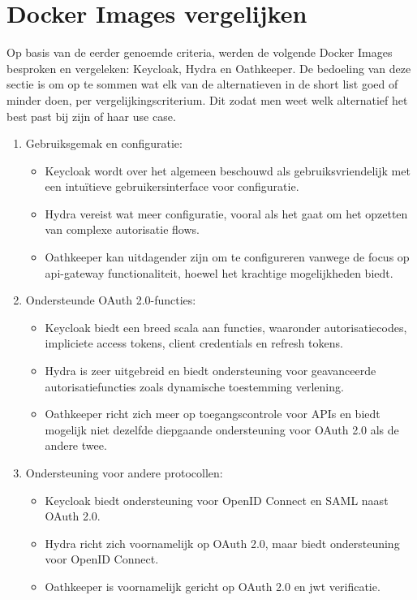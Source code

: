 \section{Docker Images vergelijken}%
\label{sec:docker-images-vergelijken}
Op basis van de eerder genoemde criteria, werden de volgende Docker Images besproken en vergeleken: Keycloak, Hydra en Oathkeeper.
De bedoeling van deze sectie is om op te sommen wat elk van de alternatieven in de short list goed of minder doen, per vergelijkingscriterium.
Dit zodat men weet welk alternatief het best past bij zijn of haar use case.

\begin{enumerate}
  \item Gebruiksgemak en configuratie:
  \begin{itemize}
    \item Keycloak wordt over het algemeen beschouwd als gebruiksvriendelijk met een intuïtieve gebruikersinterface voor configuratie.
    \item Hydra vereist wat meer configuratie, vooral als het gaat om het opzetten van complexe autorisatie flows.
    \item Oathkeeper kan uitdagender zijn om te configureren vanwege de focus op \gls{api}-gateway functionaliteit, hoewel het krachtige mogelijkheden biedt.
  \end{itemize}
  
  \item Ondersteunde OAuth 2.0-functies:
  \begin{itemize}
    \item Keycloak biedt een breed scala aan functies, waaronder autorisatiecodes, impliciete access tokens, client credentials en refresh tokens.
    \item Hydra is zeer uitgebreid en biedt ondersteuning voor geavanceerde autorisatiefuncties zoals dynamische toestemming verlening.
    \item Oathkeeper richt zich meer op toegangscontrole voor APIs en biedt mogelijk niet dezelfde diepgaande ondersteuning voor OAuth 2.0 als de andere twee.
  \end{itemize}
  
  \item Ondersteuning voor andere protocollen:
  \begin{itemize}
    \item Keycloak biedt ondersteuning voor OpenID Connect en SAML naast OAuth 2.0.
    \item Hydra richt zich voornamelijk op OAuth 2.0, maar biedt ondersteuning voor OpenID Connect.
    \item Oathkeeper is voornamelijk gericht op OAuth 2.0 en \gls{jwt} verificatie.
  \end{itemize}
  

\end{enumerate}
